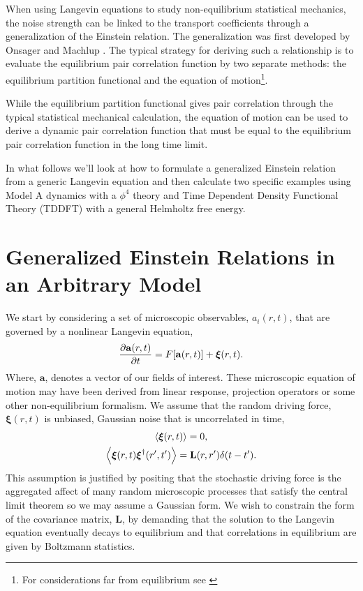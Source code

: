 \label{appendix:noise}

When using Langevin equations to study non-equilibrium statistical mechanics,
the noise strength can be linked to the transport coefficients through a
generalization of the Einstein relation. The generalization was first developed
by Onsager and Machlup \cite{OnsagerMachlup}. The typical strategy for deriving
such a relationship is to evaluate the equilibrium pair correlation function by
two separate methods: the equilibrium partition functional and the equation of
motion\footnote{For considerations far from equilibrium see \cite{Lax, Ronis,
Fox_and_Uhlenbeck}}.

While the equilibrium partition functional gives pair correlation through the
typical statistical mechanical calculation, the equation of motion can be used
to derive a dynamic pair correlation function that must be equal to the
equilibrium pair correlation function in the long time limit.

In what follows we'll look at how to formulate a generalized Einstein relation
from a generic Langevin equation and then calculate two specific examples using
Model A dynamics with a $\phi^4$ theory and Time Dependent Density Functional
Theory (TDDFT) with a general Helmholtz free energy.

\section{Generalized Einstein Relations in an Arbitrary Model} %

We start by considering a set of microscopic observables, $a_i(r, t)$, that are
governed by a nonlinear Langevin equation,
%
\begin{equation} 
    \frac{\partial \mathbf{a}(r, t)}{\partial t} = 
        F[\mathbf{a}(r,t)]
      + \boldsymbol{\xi}(r,t).
\end{equation}
%
Where, $\mathbf{a}$, denotes a vector of our fields of interest. These
microscopic equation of motion may have been derived from linear response,
projection operators or some other non-equilibrium formalism. We assume that
the random driving force, $\boldsymbol{\xi}(r, t)$ is unbiased, Gaussian noise
that is uncorrelated in time,
%
\begin{gather}
    \left\langle \boldsymbol{\xi}(r,t) \right\rangle = 0, \\ 
    \label{eq:noise_form} 
    \left\langle \boldsymbol{\xi}(r,t) \boldsymbol{\xi}^\dagger(r^\prime,t^\prime) \right\rangle =
        \mathbf{L}(r, r^\prime)\delta(t-t^\prime).
\end{gather}
%
This assumption is justified by positing that the stochastic driving force is
the aggregated affect of many random microscopic processes that satisfy the
central limit theorem so we may assume a Gaussian form. We wish to constrain
the form of the covariance matrix, $\mathbf{L}$, by demanding that the solution
to the Langevin equation eventually decays to equilibrium and that correlations
in equilibrium are given by Boltzmann statistics.

